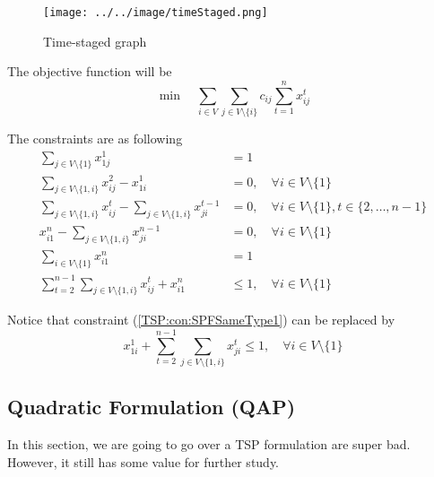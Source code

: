                 \begin{figure}[!h]
                    \centering
                    \texttt{[image: ../../image/timeStaged.png]}
                    \caption{Time-staged graph}
                    \label{fig:timeStaged}
                \end{figure}

                The objective function will be
                \begin{equation}
                    \min \quad \sum_{i \in V}\sum_{j \in V\setminus \{i\}} c_{ij} \sum_{t = 1}^n x_{ij}^t
                \end{equation}

                The constraints are as following
                \begin{align}
                    \sum_{j \in V \setminus \{1\}} x_{1j}^1 &= 1 \label{TSP:con:SPFStart}\\
                    \sum_{j \in V \setminus \{1, i\}} x_{ij}^2 - x_{1i}^1 &= 0, \quad \forall i \in V \setminus \{1\} \label{TSP:con:SPFFirstLayer}\\
                    \sum_{j \in V \setminus \{1, i\}} x_{ij}^t - \sum_{j \in V \setminus \{1, i\}} x_{ji}^{t - 1} &= 0, \quad \forall i \in V \setminus \{1\}, t \in \{2, \dots, n - 1\} \label{TSP:con:SPFTthLayer}\\
                    x_{i1}^n - \sum_{j \in V \setminus \{1, i\}} x_{ji}^{n - 1} &= 0, \quad \forall i \in V \setminus \{1\} \label{TSP:con:SPFLastLayer}\\
                    \sum_{i \in V \setminus \{1\}} x_{i1}^n &= 1 \label{TSP:con:SPFEnd}\\
                    \sum_{t = 2}^{n - 1}\sum_{j \in V \setminus \{1, i\}} x_{ij}^t + x_{i1}^n & \le 1, \quad \forall i \in V \setminus \{1\} \label{TSP:con:SPFSameType1}
                \end{align}

                Notice that constraint (\ref{TSP:con:SPFSameType1}) can be replaced by
                \begin{equation}
                    x_{1i}^1 + \sum_{t = 2}^{n - 1}\sum_{j \in V \setminus \{1, i\}} x_{ji}^t \le 1, \quad \forall i \in V \setminus \{1\} \label{TSP:con:SPFSameType2}
                \end{equation}

            \subsection{Quadratic Formulation (QAP)}
                In this section, we are going to go over a TSP formulation are super bad. However, it still has some value for further study.

